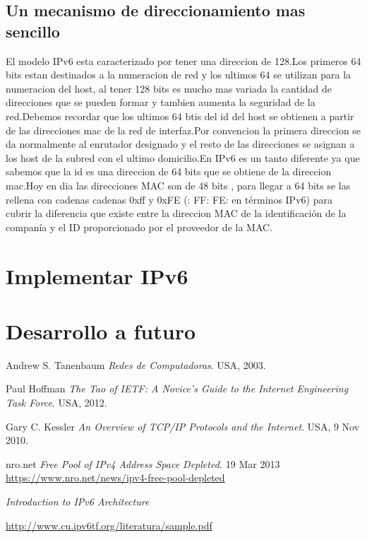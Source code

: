 \documentclass[11pt,a4paper]{article}
\begin{document}
\subsection{Un mecanismo de direccionamiento  mas sencillo}

El modelo IPv6 esta  caracterizado por tener  una direccion de 128.Los primeros 64 bits estan destinados a la numeracion de red y los ultimos 64 se utilizan para la numeracion del host, al tener 128 bits es mucho mas variada la cantidad de direcciones que se pueden formar  y tambien aumenta la seguridad de la red.Debemos recordar que los ultimos 64 btis del id del host se obtienen a partir de las direcciones mac de la red de interfaz.Por convencion la primera direccion se da normalmente al enrutador designado y el resto de las direcciones se asignan a los host de la subred con el ultimo domicilio.En IPv6 es un tanto diferente ya que  sabemos que la id es una direccion  de 64 bits que se obtiene de la direccion mac.Hoy en dia las direcciones MAC son de 48 bits , para llegar a 64 bits se las rellena con cadenas cadenas 0xff y 0xFE (: FF: FE: en términos IPv6) para cubrir la diferencia que existe entre la direccion MAC de la identificación de la companía y el ID proporcionado por el proveedor de la MAC.\par


\section{Implementar IPv6}
\section{Desarrollo a futuro}

\newpage
\begin{thebibliography}{9}

  Andrew S. Tanenbaum
  \emph{Redes de Computadoras}.
  USA,
  2003.

  Paul Hoffman
  \emph{The Tao of IETF: A Novice's Guide to the Internet Engineering Task Force}.
  USA,
  2012.
		
  Gary C. Kessler
  \emph{An Overview of TCP/IP Protocols and the Internet}.
  USA,
  9 Nov 2010.
		
 nro.net
 \emph{Free Pool of IPv4 Address Space Depleted.} 
 19 Mar 2013\\
	\url{https://www.nro.net/news/ipv4-free-pool-depleted}	


 \emph{Introduction to IPv6 Architecture} 

	\url{http://www.cu.ipv6tf.org/literatura/sample.pdf}		
		
\end{thebibliography}
\end{document}
